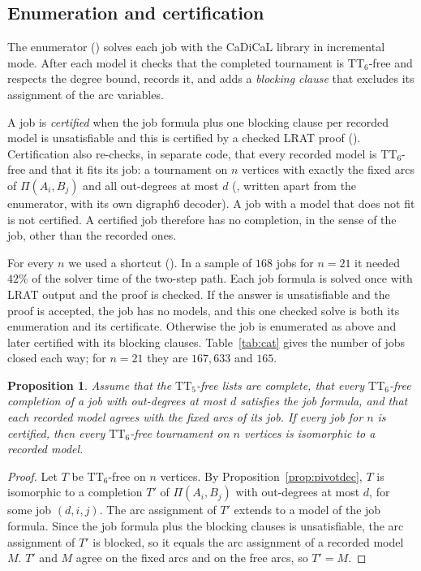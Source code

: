 \documentclass[11pt]{amsart}
\newtheorem{proposition}[theorem]{Proposition}
\theoremstyle{definition}
\theoremstyle{remark}
\newcommand{\TT}[1]{\mathrm{TT}_{#1}}
\newcommand{\Piv}[2]{\Pi(#1,#2)}
\begin{document}
\subsection{Enumeration and certification}
The enumerator () solves each job with the CaDiCaL
library in incremental mode. After each model it checks that the completed
tournament is $\TT{6}$-free and respects the degree bound, records it, and adds
a \emph{blocking clause} that excludes its assignment of the arc variables.

A job is \emph{certified} when the job formula plus one blocking clause per
recorded model is unsatisfiable and this is certified by a checked LRAT proof
(). Certification also re-checks, in separate
code, that every recorded model is $\TT{6}$-free and that it fits its job: a
tournament on $n$ vertices with exactly the fixed arcs of $\Piv{A_i}{B_j}$
and all out-degrees at most $d$ (, written
apart from the enumerator, with its own digraph6 decoder). A job with a model
that does not fit is not certified. A certified job therefore has no
completion, in the sense of the job, other than the recorded ones.

For every $n$ we used a shortcut (). In a
sample of $168$ jobs for $n=21$ it needed $42\%$ of the solver time of the
two-step path. Each job formula is solved once with
LRAT output and the proof is checked. If the answer is unsatisfiable and the
proof is accepted, the job has no models, and this one checked solve is both
its enumeration and its certificate. Otherwise the job is enumerated as above
and later certified with its blocking clauses. Table~\ref{tab:cat} gives the
number of jobs closed each way; for $n=21$ they are $167{,}633$ and $165$.

\begin{proposition}\label{prop:complete}
Assume that the $\TT{5}$-free lists are complete, that every
$\TT{6}$-free completion of a job with out-degrees at most $d$ satisfies the
job formula, and that each recorded model agrees with the fixed arcs of its
job. If every job for $n$ is certified, then every $\TT{6}$-free tournament on
$n$ vertices is isomorphic to a recorded model.
\end{proposition}

\begin{proof}
Let $T$ be $\TT{6}$-free on $n$ vertices. By
Proposition~\ref{prop:pivotdec}, $T$ is isomorphic to a completion $T'$ of
$\Piv{A_i}{B_j}$ with out-degrees at most $d$, for some job $(d,i,j)$. The arc
assignment of $T'$ extends to a model of the job formula. Since the job
formula plus the blocking clauses is unsatisfiable, the arc assignment of $T'$
is blocked, so it equals the arc assignment of a recorded model $M$. $T'$ and
$M$ agree on the fixed arcs and on the free arcs, so $T' = M$.
\end{proof}
\end{document}
